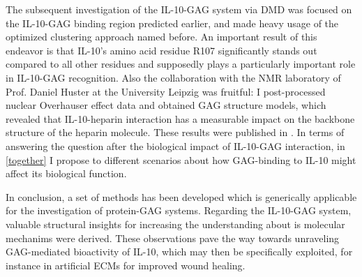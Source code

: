 The subsequent investigation of the IL-10-GAG system via DMD was focused on the
IL-10-GAG binding region predicted earlier, and made heavy usage of the
optimized clustering approach named before. An important result of this endeavor
is that IL-10's amino acid residue R107 significantly stands out compared to all
other residues and supposedly plays a particularly important role in IL-10-GAG
recognition. Also the collaboration with the NMR laboratory of Prof. Daniel
Huster at the University Leipzig was fruitful: I post-processed nuclear
Overhauser effect data and obtained GAG structure models, which revealed that
IL-10-heparin interaction has a measurable impact on the backbone structure of
the heparin molecule. These results were published in
\cite{kuenze_gehrcke_2014}. In terms of answering the question after the
biological impact of IL-10-GAG interaction, in \cref{together} I propose to
different scenarios about how GAG-binding to IL-10 might affect its biological
function.

In conclusion, a set of methods has been developed which is generically
applicable for the investigation of protein-GAG systems. Regarding the IL-10-GAG
system, valuable structural insights for increasing the understanding about is
molecular mechanims were derived. These observations pave the way towards
unraveling GAG-mediated bioactivity of IL-10, which may then be specifically
exploited, for instance in artificial ECMs for improved wound healing.
